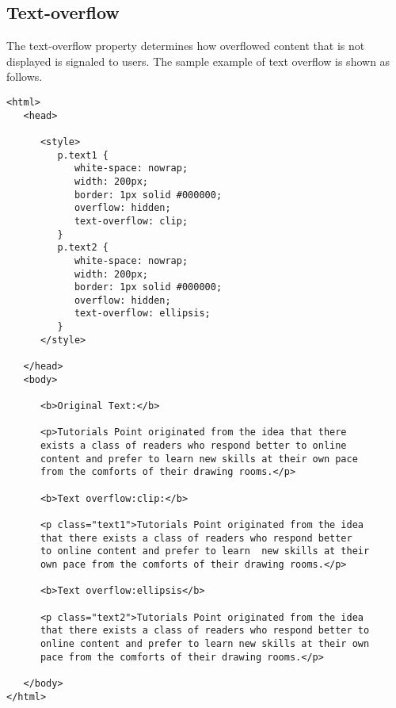 \documentclass[a4paper,oneside]{book}
\numberwithin{equation}{chapter}
\begin{document}
\subsection{Text-overflow}
The text-overflow property determines how overflowed content that is not displayed is signaled to users. The sample example of text overflow is shown as follows.
\begin{verbatim}
<html>
   <head>
   
      <style>
         p.text1 {
            white-space: nowrap; 
            width: 200px; 
            border: 1px solid #000000;
            overflow: hidden;
            text-overflow: clip;
         }
         p.text2 {
            white-space: nowrap; 
            width: 200px; 
            border: 1px solid #000000;
            overflow: hidden;
            text-overflow: ellipsis;
         }
      </style>
      
   </head>
   <body>
   
      <b>Original Text:</b>
   
      <p>Tutorials Point originated from the idea that there 
      exists a class of readers who respond better to online 
      content and prefer to learn new skills at their own pace 
      from the comforts of their drawing rooms.</p>
      
      <b>Text overflow:clip:</b>
   
      <p class="text1">Tutorials Point originated from the idea
      that there exists a class of readers who respond better 
      to online content and prefer to learn  new skills at their 
      own pace from the comforts of their drawing rooms.</p>
      
      <b>Text overflow:ellipsis</b>
   
      <p class="text2">Tutorials Point originated from the idea 
      that there exists a class of readers who respond better to 
      online content and prefer to learn new skills at their own 
      pace from the comforts of their drawing rooms.</p>
      
   </body>
</html>
\end{verbatim}
\end{document}
